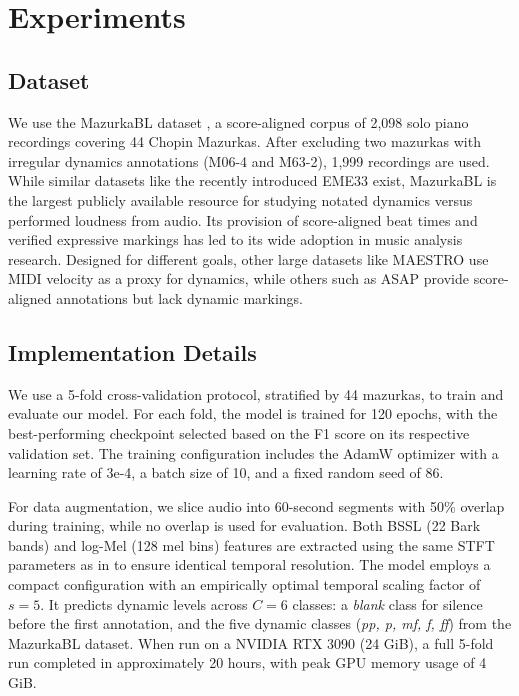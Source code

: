 \documentclass{article}
\begin{document}
\section{Experiments}
\label{sec:exp}

\subsection{Dataset}
\label{ssec:data}
We use the MazurkaBL dataset \cite{kosta2018mazurkabl}, a score-aligned corpus of 2,098 solo piano recordings covering 44 Chopin Mazurkas. After excluding two mazurkas with irregular dynamics annotations (M06-4 and M63-2), 1,999 recordings are used. While similar datasets like the recently introduced EME33 \cite{hung2024eme33} exist, MazurkaBL is the largest publicly available resource for studying notated dynamics versus performed loudness from audio. Its provision of score-aligned beat times and verified expressive markings has led to its wide adoption in music analysis research. Designed for different goals, other large datasets like MAESTRO \cite{hawthorne2019maestro} use MIDI velocity as a proxy for dynamics, while others such as ASAP \cite{foscarin2020asap} provide score-aligned annotations but lack dynamic markings.
\subsection{Implementation Details}
\label{ssec:impl}
We use a 5-fold cross-validation protocol, stratified by 44 mazurkas, to train and evaluate our model. For each fold, the model is trained for 120 epochs, with the best-performing checkpoint selected based on the F1 score on its respective validation set. The training configuration includes the AdamW optimizer with a learning rate of 3e-4, a batch size of 10, and a fixed random seed of 86. 

For data augmentation, we slice audio into 60-second segments with 50\% overlap during training, while no overlap is used for evaluation. Both BSSL (22 Bark bands) and log-Mel (128 mel bins) features are extracted using the same STFT parameters as in \cite{foscarin2024beat} to ensure identical temporal resolution. The model employs a compact configuration with an empirically optimal temporal scaling factor of $s=5$. It predicts dynamic levels across $C=6$ classes: a \textit{blank} class for silence before the first annotation, and the five dynamic classes (\textit{pp, p, mf, f, ff}) from the MazurkaBL dataset. When run on a NVIDIA RTX 3090 (24 GiB), a full 5-fold run completed in approximately 20 hours, with peak GPU memory usage of 4 GiB.
\end{document}
